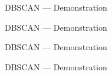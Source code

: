 \begin{frame}{DBSCAN --- Demonstration}
\end{frame}

\begin{frame}{DBSCAN --- Demonstration}
\end{frame}

\begin{frame}{DBSCAN --- Demonstration}
\end{frame}

\begin{frame}{DBSCAN --- Demonstration}
\end{frame}

